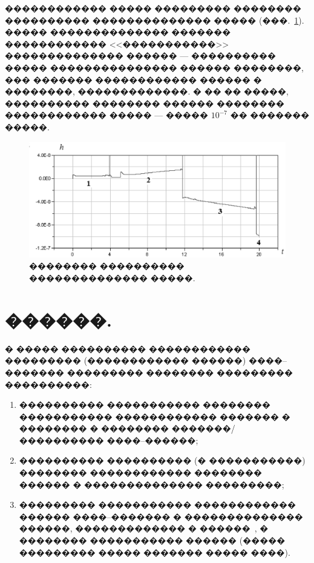 \documentclass[12pt,a4paper]{article}
\begin{document}
������������ ����� ��������� �������� ���������� �������������� ����� 
(���.~\ref{fig2}). ����� �������������� ������� ������������ <<�����������>>
�������������� ������ --- ���������� ����� ��������������� ������ ��������, ���
������� ������������ ������ � ��������, �������������. � �� �� �����, 
���������� �������� ������ �������� ������������ ����� --- ����� $10^{-7}$
�� ������� �����.
\begin{figure}[htb]
\centerline{\includegraphics[width=15cm]{Figure21.eps}}
\caption{�������� ���������� �������������� �����.}
\label{fig2}
\end{figure}

\section{������.\ }

� ����� ���������� ������������ ��������� (������������ ������) ����--������� 
��������� �������� ��������� ����������:
\begin{enumerate}

\item
���������� ����������� �������� ����������� ������������ ������� � �������� �
�������� �������/���������� ����--������;

\item
���������� ���������� (� �����������) �������� ������������ �������� ������ � 
�������������� ���������;

\item
��������� ����������� ������������ ������ ����--������� � �������������� 
������, ������������� � ������~\cite{BorisovKilinMamaev}, � �������� 
����������� ������ (����� ��������� ����� ������� ����� ����).

\end{enumerate}
\end{document}
